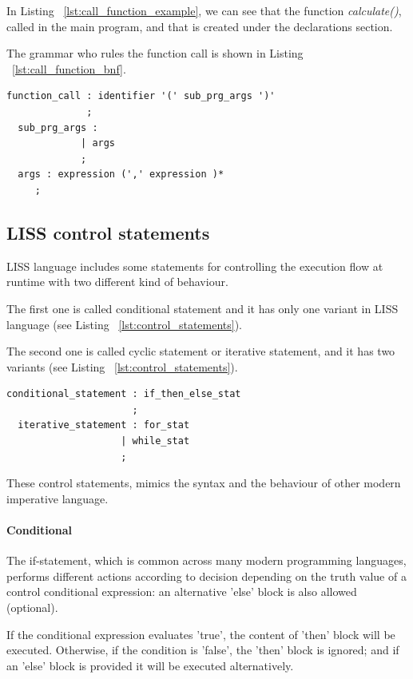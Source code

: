 \documentclass[
  oneside,
  11pt, a4paper,
  footinclude=true,
  headinclude=true,
  cleardoublepage=empty
]{scrbook}
\begin{document}
In Listing ~\ref{lst:call_function_example}, we can see that the function \textit{calculate()}, called in the main program, and that is created under the declarations section.

The grammar who rules the function call is shown in Listing ~\ref{lst:call_function_bnf}.

\begin{lstlisting}[caption={CFG for call function in LISS},label={lst:call_function_bnf}]
  function_call : identifier '(' sub_prg_args ')'
              ;
  sub_prg_args :
             | args
             ;
  args : expression (',' expression )*
     ;

\end{lstlisting}

\subsection{LISS control statements}

LISS language includes some statements for controlling the execution flow at runtime with two different kind of behaviour.

The first one is called conditional statement and it has only one variant in LISS language (see Listing ~\ref{lst:control_statements}).

The second one is called cyclic statement or iterative statement, and it has two variants (see Listing ~\ref{lst:control_statements}).

\begin{lstlisting}[caption={CFG for control statement in LISS},label={lst:control_statements}]
  conditional_statement : if_then_else_stat
                      ;
  iterative_statement : for_stat
                    | while_stat
                    ;
\end{lstlisting}

These control statements, mimics the syntax and the behaviour  of other modern imperative language.

\paragraph{Conditional}

The if-statement, which is common across many modern programming languages, performs different actions according to decision depending on the truth value of a control conditional expression: an alternative 'else' block is also allowed (optional).

If the conditional expression evaluates 'true', the content of 'then' block will be executed. Otherwise, if the condition is 'false', the 'then' block is ignored; and if an 'else' block is provided it will be executed alternatively.
\end{document}

